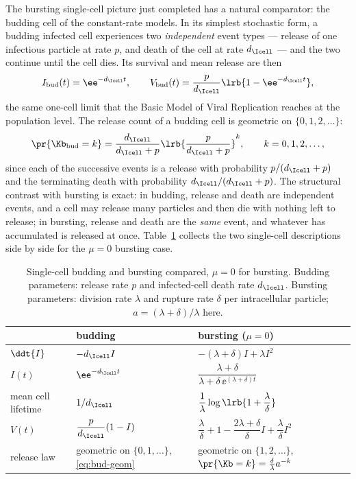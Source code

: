 The bursting single-cell picture just completed has a natural comparator:
the budding cell of the constant-rate models. In its simplest stochastic
form, a budding infected cell experiences two \textit{independent} event
types --- release of one infectious particle at rate $p$, and death of the
cell at rate $d_{\Icell}$ --- and the two continue until the cell dies. Its
survival and mean release are then
$$I_{\rm bud}(t)=\ee^{-d_{\Icell}t},\qquad
V_{\rm bud}(t)=\frac{p}{d_{\Icell}}\lrb{1-\ee^{-d_{\Icell}t}},$$
the same one-cell limit that the Basic Model of Viral Replication reaches at
the population level. The release count of a budding cell is geometric on
$\{0,1,2,\ldots\}$:
\begin{equation}
\pr{\Kb_{\rm bud}=k}=\frac{d_{\Icell}}{d_{\Icell}+p}
\lrb{\frac{p}{d_{\Icell}+p}}^k,\qquad k=0,1,2,\ldots,
\label{eq:bud-geom}
\end{equation}
since each of the successive events is a release with probability
$p/(d_{\Icell}+p)$ and the terminating death with probability
$d_{\Icell}/(d_{\Icell}+p)$. The structural contrast with bursting is exact:
in budding, release and death are independent events, and a cell may release
many particles and then die with nothing left to release; in bursting,
release and death are the \textit{same} event, and whatever has accumulated
is released at once. Table~\ref{tab:budburst} collects the two single-cell
descriptions side by side for the $\mu=0$ bursting case.

\begin{table}[H]
\centering
\renewcommand{\arraystretch}{1.4}
\small
\begin{tabular}{@{}lll@{}}
\toprule
 & budding & bursting ($\mu=0$) \\
\midrule
$\ddt{I}$ & $-d_{\Icell} I$ & $-(\lambda+\delta)I+\lambda I^2$ \\
$I(t)$ & $\ee^{-d_{\Icell}t}$ & $\dfrac{\lambda+\delta}{\lambda+\delta\,\ee^{(\lambda+\delta)t}}$ \\
mean cell lifetime & $1/d_{\Icell}$ & $\dfrac{1}{\lambda}\log\lrb{1+\dfrac{\lambda}{\delta}}$ \\
$V(t)$ & $\dfrac{p}{d_{\Icell}}(1-I)$ & $\dfrac{\lambda}{\delta}+1-\dfrac{2\lambda+\delta}{\delta}I+\dfrac{\lambda}{\delta}I^2$ \\
release law & geometric on $\{0,1,\ldots\}$, \eqref{eq:bud-geom} & geometric on $\{1,2,\ldots\}$, $\pr{\Kb=k}=\frac{\delta}{\lambda}a^{-k}$ \\
\bottomrule
\end{tabular}
\caption{Single-cell budding and bursting compared, $\mu=0$ for bursting.
Budding parameters: release rate $p$ and infected-cell death rate
$d_{\Icell}$. Bursting parameters: division rate $\lambda$ and rupture rate
$\delta$ per intracellular particle; $a=(\lambda+\delta)/\lambda$ here.}
\label{tab:budburst}
\end{table}

